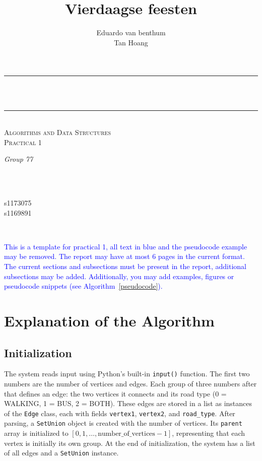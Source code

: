\documentclass[a4paper]{article}
\title{Vierdaagse feesten}
\author{Eduardo van benthum \\ Tan Hoang}
\makeatletter
\newcommand{\instruction}[1]{\textcolor{blue}{#1}}
\let\thetitle\@title
\let\theauthor\@author
\makeatother
\begin{document}
\begin{center}
\rule{\linewidth}{0.2 mm} \\[0.4 cm]
{ \huge \bfseries \thetitle}\\
\rule{\linewidth}{0.2 mm} \\[0.5 cm]
\textsc{\Large Algorithms and Data Structures}\\[0.2 cm]				
\textsc{\large Practical 1}\\[0.5 cm]				

\begin{minipage}{0.4\textwidth}
    \begin{flushleft} \large
        \emph{Group 77}\\
        \theauthor
        \end{flushleft}
        \end{minipage}~
        \begin{minipage}{0.4\textwidth}
        \begin{flushright} \large
        ~\\
        s1173075\\	s1169891
    \end{flushright}
\end{minipage}\\[1 cm]
\end{center}

\noindent\instruction{This is a template for practical 1, all text in blue and the pseudocode example may be removed. The report may have at most 6 pages in the current format. The current sections and subsections must be present in the report, additional subsections may be added. Additionally, you may add examples, figures or pseudocode snippets (see Algorithm~\ref{pseudocode}).}


\section{Explanation of the Algorithm}
\subsection{Initialization}
The system reads input using Python's built-in \texttt{input()} function. The first two numbers are the number of vertices and edges. Each group of three numbers after that defines an edge: the two vertices it connects and its road type (0 = WALKING, 1 = BUS, 2 = BOTH). These edges are stored in a list as instances of the \texttt{Edge} class, each with fields \texttt{vertex1}, \texttt{vertex2}, and \texttt{road\_type}. 
After parsing, a \texttt{SetUnion} object is created with the number of vertices. Its \texttt{parent} array is initialized to \([0, 1, \dots, \text{number\_of\_vertices}-1]\), representing that each vertex is initially its own group.
At the end of initialization, the system has a list of all edges and a \texttt{SetUnion} instance.
\end{document}
